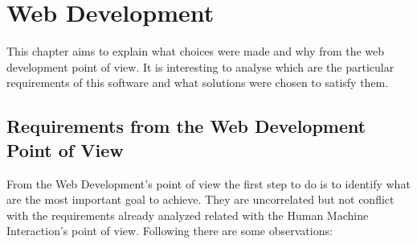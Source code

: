 
\chapter{Web Development} %

\label{Chapter 9} %


This chapter aims to explain what choices were made and why from the web development point of view. It is interesting to analyse which are the particular requirements of this software and what solutions were chosen to satisfy them. 

\section{Requirements from the Web Development Point of View}

From the Web Development's point of view the first step to do is to identify what are the most important goal to achieve. They are uncorrelated but not conflict with the requirements already analyzed related with the Human Machine Interaction's point of view. Following there are some observations:

